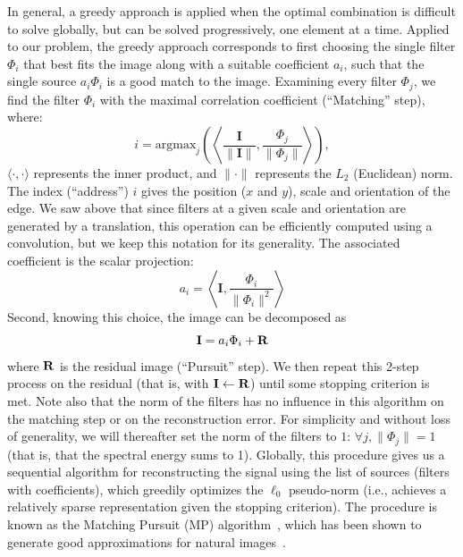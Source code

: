\documentclass[a4paper, 11pt]{book}
\begin{document}
In general, a greedy approach is applied when the optimal combination is
difficult to solve globally, but can be solved progressively,
one element at a time.
Applied to our problem, the greedy approach corresponds to first choosing
the single filter $\Phi_i$ that best fits the image along with a suitable coefficient $a_i$,
such that the single source $a_i\Phi_i$ is a good match to the image.
Examining every filter $\Phi_j$, we find the filter $\Phi_i$
with the maximal correlation coefficient (``Matching'' step), where:
\begin{equation}
i = \mbox{argmax}_j \left( \left\langle \frac{\mathbf{I}}{\| \mathbf{I} \|} , \frac{
\Phi_j}{\| \Phi_j\|} \right\rangle \right),
\label{eq:coco}
\end{equation}
$\langle \cdot,\cdot \rangle$ represents the inner product, and $\| \cdot \|$
represents the $L_2$ (Euclidean) norm.
The index (``address'') $i$ gives the position ($x$ and $y$), scale and orientation of the edge.
We saw above that since filters at a given scale and orientation are generated by a translation,
this operation can be efficiently computed using a convolution,
but we keep this notation for its generality.
The associated coefficient is the scalar projection:
\begin{equation}
a_{i} = \left\langle \mathbf{I} , \frac{ \Phi_{i}}{\| \Phi_{i}\|^2} \right\rangle
\label{eq:proj}
\end{equation}
Second, knowing this choice, the image can be
decomposed as
\begin{equation}
\mathbf{I} = a_{i} \Phi_{i} + \bf{R}
\label{eq:mp0} \end{equation}
where $\bf{R}$ is the residual image (``Pursuit'' step).
We then repeat this 2-step process on the residual (that is, with $\mathbf{I} \leftarrow \bf{R}$)
until some stopping criterion is met.
Note also that the norm of the filters has no influence in this algorithm
on the matching step or on the reconstruction error.
For simplicity and without loss of generality,
we will thereafter set the norm of the filters to $1$: $\forall j, \| \Phi_j \| =1$ (that is, that the spectral energy sums to 1).
Globally, this procedure gives us a sequential algorithm for reconstructing the signal
using the list of sources (filters with coefficients), which greedily optimizes the $\ell_0$ pseudo-norm
(i.e., achieves a relatively sparse representation given the stopping criterion).
The procedure is known as the Matching Pursuit (MP) algorithm~\citep{Mallat93},
which has been shown to generate good approximations for natural images~\citep{Perrinet03ieee,Perrinet10shl}.
\end{document}
